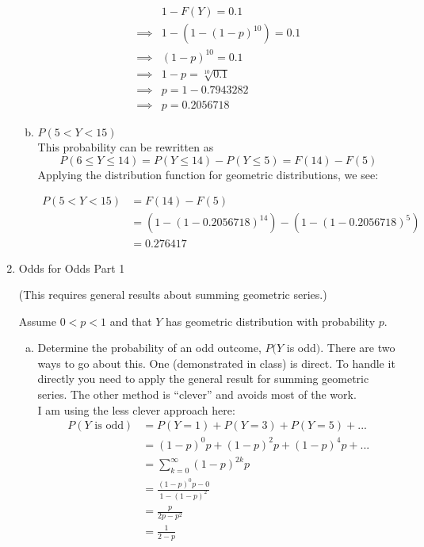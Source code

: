\documentclass{scrartcl}
\begin{document}
\begin{enumerate}
\begin{enumerate}[a)]
\begin{align*}
  &1 - F(Y) = 0.1\\
  \implies& 1 - \left(1 - (1 - p)^{10}\right) = 0.1\\
  \implies& (1-p)^{10} = 0.1\\
  \implies& 1-p = \sqrt[10]{0.1}\\
  \implies& p = 1 - 0.7943282\\
  \implies& p = 0.2056718
\end{align*}

\item $P(5 < Y < 15)$\\

  This probability can be rewritten as $$P(6 \le Y \le 14) = P(Y \le 14) - P(Y \le 5) = F(14)-F(5)$$ Applying the distribution function for geometric distributions, we see:

\begin{align*}
  P(5 < Y < 15) &= F(14) - F(5)\\
  &= (1 - (1 - 0.2056718)^{14}) - (1 - (1 - 0.2056718)^5)\\
  &= 0.276417
\end{align*}

\end{enumerate}
\pagebreak

\item Odds for Odds Part 1

(This requires general results about summing geometric series.)

Assume $0 < p < 1$ and that $Y$ has geometric distribution with probability $p$.\\
\begin{enumerate}[a)]
\item Determine the probability of an odd outcome, $P(Y$ is odd$)$. There are two ways to go about this. One (demonstrated in class) is direct. To handle it directly you need to apply the general result for summing geometric series. The other method is “clever” and avoids most of the work.\\

I am using the less clever approach here:
\begin{align*}
  P(Y \text{ is odd}) &= P(Y=1) + P(Y=3) + P(Y=5) + ...\\
  &= (1-p)^0p + (1-p)^2p + (1-p)^4p + ...\\
  &= \sum_{k=0}^\infty(1-p)^{2k}p\\
  &= \frac{(1-p)^0p - 0}{1 - (1-p)^2}\\
  &= \frac{p}{2p-p^2}\\
  &= \frac{1}{2-p}
\end{align*}


\end{enumerate}
\end{enumerate}
\end{document}
